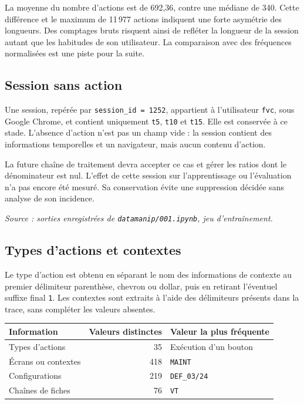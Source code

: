 \documentclass[10pt,a4paper]{article}
\newcommand{\sourceexploration}{\textit{Source : sorties enregistrées de \texttt{datamanip/001.ipynb}, jeu d'entraînement.}}
\begin{document}
La moyenne du nombre d'actions est de 692,36, contre une médiane de 340.
Cette différence et le maximum de 11\,977 actions indiquent une forte
asymétrie des longueurs. Des comptages bruts risquent ainsi de refléter
la longueur de la session autant que les habitudes de son utilisateur.
La comparaison avec des fréquences normalisées est une piste pour la suite.

\subsection{Session sans action}
Une session, repérée par \texttt{session\_id = 1252}, appartient à
l'utilisateur \texttt{fvc}, sous Google Chrome, et contient uniquement
\texttt{t5}, \texttt{t10} et \texttt{t15}. Elle est conservée à ce stade.
L'absence d'action n'est pas un champ vide : la session contient des
informations temporelles et un navigateur, mais aucun contenu d'action.

La future chaîne de traitement devra accepter ce cas et gérer les ratios
dont le dénominateur est nul. L'effet de cette session sur l'apprentissage
ou l'évaluation n'a pas encore été mesuré. Sa conservation évite une
suppression décidée sans analyse de son incidence.

\sourceexploration

\newpage
\subsection{Types d'actions et contextes}
Le type d'action est obtenu en séparant le nom des informations de contexte
au premier délimiteur parenthèse, chevron ou dollar, puis en retirant
l'éventuel suffixe final \texttt{1}. Les contextes sont extraits à l'aide
des délimiteurs présents dans la trace, sans compléter les valeurs absentes.

\begin{center}
\begin{tabularx}{\linewidth}{Y r Y}
\toprule
Information & Valeurs distinctes & Valeur la plus fréquente \\
\midrule
Types d'actions & 35 & Exécution d'un bouton \\
Écrans ou contextes & 418 & \texttt{MAINT} \\
Configurations & 219 & \texttt{DEF\_03/24} \\
Chaînes de fiches & 76 & \texttt{VT} \\
\bottomrule
\end{tabularx}
\end{center}
\end{document}
